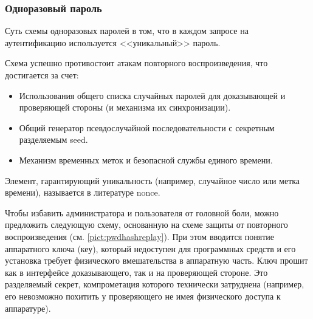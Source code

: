 \begin{frame}
\frametitle{Одноразовый пароль}
\begin{definition}%
Суть схемы \alert{одноразовых паролей} в том, что в каждом запросе на аутентификацию используется <<уникальный>> пароль.
\end{definition}
Схема успешно противостоит атакам повторного воспроизведения, что достигается за счет:
\begin{itemize}
    \item Использования общего списка случайных паролей для доказывающей и проверяющей стороны (и механизма их синхронизации).
    \item Общий генератор псевдослучайной последовательности с секретным разделяемым seed.
    \item Механизм временных меток и безопасной службы единого времени.
\end{itemize}
Элемент, гарантирующий уникальность (например, случайное число или метка времени), называется в литературе \alert{nonce}.
\end{frame}


 Чтобы избавить администратора и пользователя от головной боли, можно предложить следующую схему, основанную на схеме защиты от повторного воспроизведения (см. \ref{pict:pwdhashreplay}). При этом вводится понятие аппаратного ключа (кеу), который недоступен для программных средств и его установка требует физического вмешательства в аппаратную часть. Ключ прошит как в интерфейсе доказывающего, так и на проверяющей стороне. Это разделяемый секрет, компрометация которого технически затруднена (например, его невозможно похитить у проверяющего не имея физического доступа к аппаратуре).

